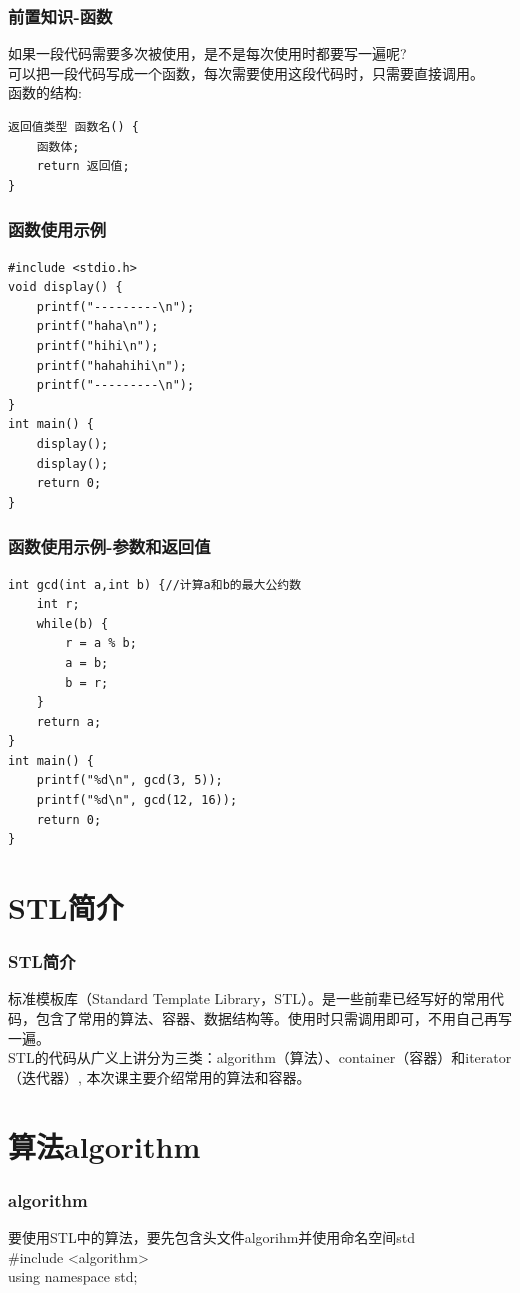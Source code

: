 \documentclass{beamer}
\begin{document}
\begin{frame}[fragile]
    \frametitle{前置知识-函数}
    如果一段代码需要多次被使用，是不是每次使用时都要写一遍呢?\\
    可以把一段代码写成一个函数，每次需要使用这段代码时，只需要直接调用。\\
    函数的结构: \\
    \begin{lstlisting}
返回值类型 函数名() {
    函数体;
    return 返回值; 
}
    \end{lstlisting}


    

\end{frame}
\begin{frame}[fragile]
    \frametitle{函数使用示例}
\begin{lstlisting}
#include <stdio.h>
void display() {
    printf("---------\n");
    printf("haha\n");
    printf("hihi\n");
    printf("hahahihi\n");
    printf("---------\n");
}
int main() {
    display();
    display();
    return 0;
}  
\end{lstlisting}

\end{frame}

\begin{frame}[fragile]
    \frametitle{函数使用示例-参数和返回值}
    \begin{lstlisting}
int gcd(int a,int b) {//计算a和b的最大公约数
    int r;
    while(b) {
        r = a % b;
        a = b;
        b = r;
    }
    return a;
}
int main() {
    printf("%d\n", gcd(3, 5));
    printf("%d\n", gcd(12, 16));
    return 0;
}
        \end{lstlisting}
\end{frame}


\section{STL简介}
\begin{frame}
    \frametitle{STL简介}
    标准模板库（Standard Template Library，STL）。是一些前辈已经写好的常用代码，包含了常用的算法、容器、数据结构等。使用时只需调用即可，不用自己再写一遍。\\
    STL的代码从广义上讲分为三类：algorithm（算法）、container（容器）和iterator（迭代器）, 本次课主要介绍常用的算法和容器。

\end{frame}


\section{算法algorithm}
\begin{frame}
    \frametitle{algorithm}
    要使用STL中的算法，要先包含头文件algorihm并使用命名空间std \\
    \#include <algorithm> \\
    using namespace std;
\end{frame}
\end{document}
